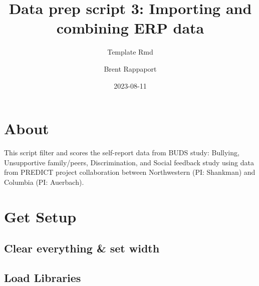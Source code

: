 \documentclass[
]{article}
\title{Data prep script 3: Importing and combining ERP data}
\subtitle{Template Rmd}
\author{Brent Rappaport}
\date{2023-08-11}
\newenvironment{Shaded}{\begin{snugshade}}{\end{snugshade}}
\newcommand{\AttributeTok}[1]{\textcolor[rgb]{0.13,0.29,0.53}{#1}}
\newcommand{\CommentTok}[1]{\textcolor[rgb]{0.56,0.35,0.01}{\textit{#1}}}
\newcommand{\ConstantTok}[1]{\textcolor[rgb]{0.56,0.35,0.01}{#1}}
\newcommand{\DecValTok}[1]{\textcolor[rgb]{0.00,0.00,0.81}{#1}}
\newcommand{\FunctionTok}[1]{\textcolor[rgb]{0.13,0.29,0.53}{\textbf{#1}}}
\newcommand{\NormalTok}[1]{#1}
\newcommand{\SpecialCharTok}[1]{\textcolor[rgb]{0.81,0.36,0.00}{\textbf{#1}}}
\newcommand{\StringTok}[1]{\textcolor[rgb]{0.31,0.60,0.02}{#1}}
\begin{document}
\maketitle

{
\setcounter{tocdepth}{3}
\tableofcontents
}
\hypertarget{about}{%
\section{About}\label{about}}

This script filter and scores the self-report data from BUDS study:
Bullying, Unsupportive family/peers, Discrimination, and Social feedback
study using data from PREDICT project collaboration between Northwestern
(PI: Shankman) and Columbia (PI: Auerbach).

\hypertarget{get-setup}{%
\section{Get Setup}\label{get-setup}}

\hypertarget{clear-everything-set-width}{%
\subsection{Clear everything \& set
width}\label{clear-everything-set-width}}

\begin{Shaded}
\end{Shaded}

\newpage{}

\hypertarget{load-libraries}{%
\subsection{Load Libraries}\label{load-libraries}}
\end{document}
